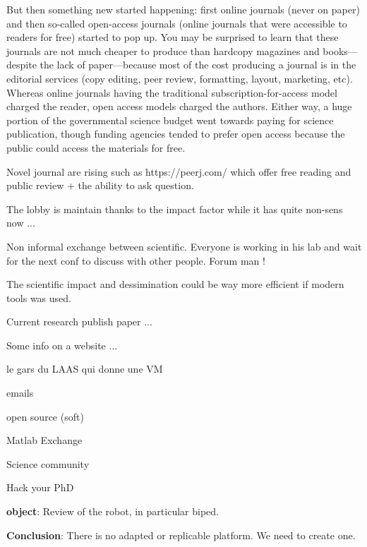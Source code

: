 But then something new started happening: first online journals (never on paper) and then so-called open-access journals (online journals that were accessible to readers for free) started to pop up. You may be surprised to learn that these journals are not much cheaper to produce than hardcopy magazines and books—despite the lack of paper—because most of the cost producing a journal is in the editorial services (copy editing, peer review, formatting, layout, marketing, etc). Whereas online journals having the traditional subscription-for-access model charged the reader, open access models charged the authors. Either way, a huge portion of the governmental science budget went towards paying for science publication, though funding agencies tended to prefer open access because the public could access the materials for free.

Novel journal are rising such as https://peerj.com/ which offer free reading and public review + the ability to ask question.

The lobby is maintain thanks to the impact factor while it has quite non-sens now ...

Non informal exchange between scientific. Everyone is working in his lab and wait for the next conf to discuss with other people. Forum man !




The scientific impact and dessimination could be way more efficient if modern tools was used.

Current research
publish paper ...

Some info on a website ...

le gars du LAAS qui donne une VM

emails

open source (soft)

Matlab Exchange

Science community

Hack your PhD


\textbf{object}: Review of the robot, in particular biped.


\textbf{Conclusion}: There is no adapted or replicable platform. We need to create one.

